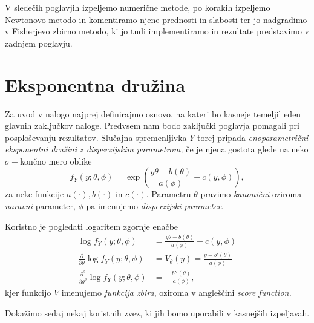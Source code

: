 \documentclass[12pt,a4paper]{amsart}
\theoremstyle{definition} %
\theoremstyle{plain} %
\begin{document}
V sledečih poglavjih izpeljemo numerične metode, po korakih izpeljemo Newtonovo metodo in komentiramo njene prednosti in slabosti ter jo nadgradimo v Fisherjevo zbirno metodo,
ki jo tudi implementiramo in rezultate predstavimo v zadnjem poglavju.

\section{Eksponentna družina}\label{eksponentnaDruzina}
Za uvod v nalogo najprej definirajmo osnovo, na kateri bo kasneje temeljil eden glavnih zaključkov naloge. Predvsem nam bodo zaključki poglavja pomagali
pri posploševanju rezultatov. Slučajna spremenljivka $Y$ torej pripada \textit{enoparametrični eksponentni družini z disperzijskim parametrom,} če je njena gostota glede na neko 
$\sigma-$končno mero oblike 
\begin{equation}
    f_{Y}(y; \theta, \phi) = \exp{\left(\frac{y\theta - b(\theta)}{a(\phi)} + c(y, \phi)\right)},
\end{equation}
za neke funkcije $a(\cdot), b(\cdot)\text{~in~}c(\cdot).$ Parametru $\theta$ pravimo \textit{kanonični} oziroma \textit{naravni} parameter,
$\phi$ pa imenujemo \textit{disperzijski parameter}.

Koristno je pogledati logaritem zgornje enačbe
\begin{align}
    \log f_{Y}(y; \theta, \phi) &= \frac{y\theta - b(\theta)}{a(\phi)} + c(y,\phi) \\
    \frac{\partial}{\partial \theta} \log f_{Y}(y;\theta, \phi) &= V_{\theta}(y) = \frac{y - b'(\theta)}{a(\phi)} \\
    \frac{\partial^2}{\partial \theta^2}\log f_{Y}(y; \theta, \phi) &= -\frac{b''(\theta)}{a(\phi)},
\end{align}
kjer funkcijo $V$ imenujemo \textit{funkcija zbira}, oziroma v angleščini \textit{score function.}


Dokažimo sedaj nekaj koristnih zvez, ki jih bomo uporabili v kasnejših izpeljavah.
\end{document}
